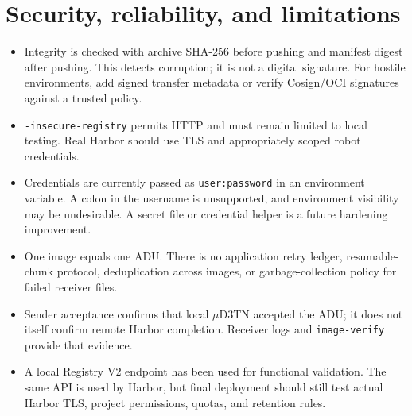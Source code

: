 \documentclass[11pt,a4paper]{article}
\newcommand{\file}[1]{\texttt{#1}}
\begin{document}
\section{Security, reliability, and limitations}
\begin{itemize}[leftmargin=*]
\item Integrity is checked with archive SHA-256 before pushing and manifest
digest after pushing. This detects corruption; it is not a digital signature.
For hostile environments, add signed transfer metadata or verify Cosign/OCI
signatures against a trusted policy.
\item \file{-insecure-registry} permits HTTP and must remain limited to local
testing. Real Harbor should use TLS and appropriately scoped robot credentials.
\item Credentials are currently passed as \file{user:password} in an
environment variable. A colon in the username is unsupported, and environment
visibility may be undesirable. A secret file or credential helper is a future
hardening improvement.
\item One image equals one ADU. There is no application retry ledger,
resumable-chunk protocol, deduplication across images, or garbage-collection
policy for failed receiver files.
\item Sender acceptance confirms that local \(\mu\)D3TN accepted the ADU; it
does not itself confirm remote Harbor completion. Receiver logs and
\file{image-verify} provide that evidence.
\item A local Registry V2 endpoint has been used for functional validation.
The same API is used by Harbor, but final deployment should still test actual
Harbor TLS, project permissions, quotas, and retention rules.
\end{itemize}
\end{document}

